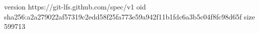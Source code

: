 version https://git-lfs.github.com/spec/v1
oid sha256:a2a279022af57319c2edd58f25fa773e59a942f11b1fdc6a3b5c04f8fc98d65f
size 599713
